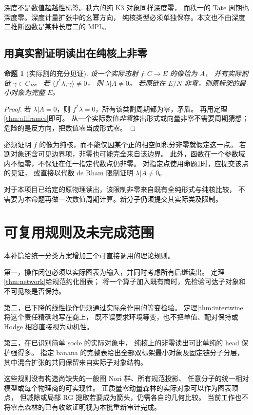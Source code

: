 \documentclass[11pt,a4paper]{ctexart}
\theoremstyle{cnplain}
\newtheorem{proposition}[theorem]{命题}
\theoremstyle{definition}
\theoremstyle{remark}
\begin{document}
深度不是数值超越性标签。秩六的纯 K3 对象同样深度零，
而秩一的 Tate 周期也深度零。深度计量扩张中的幺幂方向，
纯核类型必须单独保存。本文也不由深度二推断函数是某种长度二的 MPL。

\subsection{用真实割证明读出在纯核上非零}
\begin{proposition}[实际割的充分见证]\label{prop:cutwitness}
设一个实际态射 $f:C\to E$ 的像恰为 $A$，
并有实际割链 $\gamma\in C_B$。
若 $\langle f^*\lambda,\gamma\rangle\ne0$，
则 $\lambda|A\ne0$。
若原链在 $E/N$ 非零，则原标架的最小对象为完整 $E$。
\end{proposition}
\begin{proof}
若 $\lambda|A=0$，则 $f^*\lambda=0$，所有该类割周期都为零，矛盾。
再用定理\ref{thm:allframes}即可。
从一个实际数值\emph{非零}推出形式或向量非零不需要周期猜想；
危险的是反方向，把数值零当成形式零。
\end{proof}

必须证明 $f$ 的像为纯核，而不能仅因某个正的相空间积分非零就假定这一点。
若割对象还含可见边界项，非零也可能完全来自该边界。
此外，函数在一个参数域内不恒零，不保证在任一指定代数点仍非零。
对指定点使用命题\ref{prop:cutwitness}时，应提交该点的见证，
或直接以代数 de Rham 限制证明 $\lambda|A\ne0$。

对于本项目已给定的原物理读出，该限制非零来自既有全纯形式与纯核比较，
不需要为本命题再做一次数值周期计算。新分子仍须提交其实际类及限制。

\section{可复用规则及未完成范围}
本补篇给统一分类方案增加三个可直接调用的理论规则。

第一，操作闭包必须以实际图表为输入，并同时考虑所有后继读出。
定理\ref{thm:network}给规范约化图表；
将一个算子加入既有商时，先检验可达子对象和不可见核是否保持。

第二，已下降的线性操作仍须通过实际余作用的等变检验。
定理\ref{thm:intertwine}将这个责任精确地写在商上，
既不误要求环境等变，也不把单值、配对保持或 Hodge 相容直接视为动机性。

第三，在已识别简单 socle 的实际对象中，
纯核上的非零读出可比单纯的 head 保护强得多。
指定 banana 的完整表给出全部双标架最小对象及固定链分子分层，
其中混合扩张的共同保留来自实际子对象结构。

这些规则没有构造尚缺失的一般图 Nori 群、所有规范投影、
任意分子的统一相对模型或每个物理商的可实现性。
正质量零动量森林的实际对象可以作为图表顶点，
但减除或局部 RG 提取若要成为箭头，仍需各自的几何比较。
当前工作也不将零点森林的已有收敛证明视为本批重新审计完成。
\end{document}
